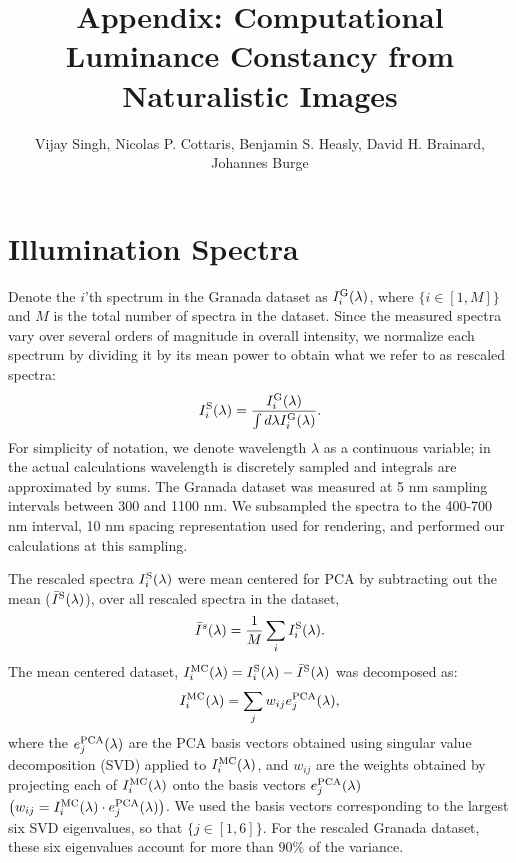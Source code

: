 \documentclass[10pt,english]{article}
\date{}
\begin{document}
\title{Appendix: Computational Luminance Constancy from Naturalistic Images}

\author{Vijay Singh, Nicolas P. Cottaris, Benjamin S. Heasly, David H. Brainard, Johannes Burge}
\maketitle



\section{Illumination Spectra}
Denote the $i$'th spectrum in the Granada dataset as $I^{\rm G}_i(\lambda)$, where $\{i \in [1,M]\}$ and $M$ is the total number of spectra in the dataset. 
Since the measured spectra vary over several orders of magnitude in overall intensity, we normalize each spectrum by dividing it by its mean power to obtain what we refer to as rescaled spectra:
\begin{align}
I_i^{\rm S}(\lambda) = \frac{I^{\rm G}_i(\lambda)}{\int d\lambda I^{\rm G}_i(\lambda)}.
\end{align}
For simplicity of notation, we denote wavelength $\lambda$ as a continuous variable; in the actual calculations wavelength is discretely sampled and integrals are approximated by sums. 
The Granada dataset was measured at 5 nm sampling intervals between 300 and 1100 nm.  
We subsampled the spectra to the 400-700 nm interval, 10 nm spacing representation used for rendering, and performed our calculations at this sampling.

The rescaled spectra $I_i^{\rm S}(\lambda)$ were mean centered for PCA by subtracting out the mean ($\bar{I}^{\rm S}(\lambda)$),  over all rescaled spectra in the dataset, 
\begin{align}
\bar{I}^{s}(\lambda) = \frac{1}{M}\sum_i{I_i^{\rm S}(\lambda)}.
\end{align} 
The mean centered dataset, $I_i^{\rm MC}(\lambda) = I_{i}^{\rm S}(\lambda) - \bar{I}^{\rm S}(\lambda)$
was decomposed as:
\begin{align}
I_i^{\rm MC}(\lambda) = \sum_j w_{ij} e_j^{\rm PCA}(\lambda),
\end{align}
where the $e_j^{\rm PCA}(\lambda)$ are the PCA basis vectors obtained using
singular value decomposition (SVD) applied to $I_i^{\rm MC}(\lambda)$, 
and $w_{ij}$ are the weights obtained by projecting each of $I_i^{\rm MC}(\lambda)$ onto the basis vectors $e_j^{\rm PCA}(\lambda)$ $\left( w_{ij} = I_i^{\rm MC}(\lambda)\cdot e_j^{\rm PCA}(\lambda)\right)$.
We used the basis vectors corresponding to
the largest six SVD eigenvalues, so that $\{j \in [1,6]\}$.
For the rescaled Granada dataset, these six  eigenvalues account for more than $90\%$ of the variance.
\end{document}
